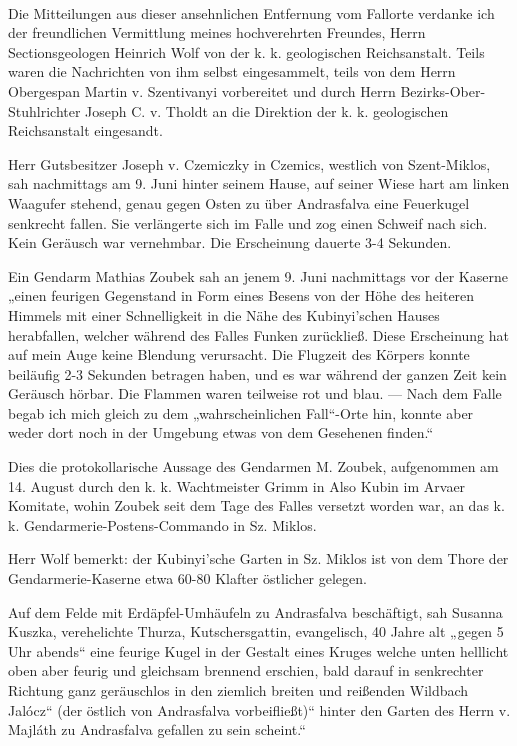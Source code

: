 \documentclass[a4paper, 11pt, oneside, german]{article}
\begin{document}
\paragraph{}
Die Mitteilungen aus dieser ansehnlichen Entfernung vom Fallorte verdanke ich der freundlichen Vermittlung meines hochverehrten Freundes, Herrn Sectionsgeologen Heinrich Wolf von der k. k. geologischen Reichsanstalt. Teils waren die Nachrichten von ihm selbst eingesammelt, teils von dem Herrn Obergespan Martin v. Szentivanyi vorbereitet und durch Herrn Bezirks-Ober-Stuhlrichter Joseph C. v. Tholdt an die Direktion der k. k. geologischen Reichsanstalt eingesandt.

Herr Gutsbesitzer Joseph v. Czemiczky in Czemics, westlich von Szent-Miklos, sah nachmittags am 9. Juni hinter seinem Hause, auf seiner Wiese hart am linken Waagufer stehend, genau gegen Osten zu über Andrasfalva eine Feuerkugel senkrecht fallen. Sie verlängerte sich im Falle und zog einen Schweif nach sich. Kein Geräusch war vernehmbar. Die Erscheinung dauerte 3-4 Sekunden.

Ein Gendarm Mathias Zoubek sah an jenem 9. Juni nachmittags vor der Kaserne „einen feurigen Gegenstand in Form eines Besens von der Höhe des heiteren Himmels mit einer Schnelligkeit in die Nähe des Kubinyi'schen Hauses herabfallen, welcher während des Falles Funken zurückließ. Diese Erscheinung hat auf mein Auge keine Blendung verursacht. Die Flugzeit des Körpers konnte beiläufig 2-3 Sekunden betragen haben, und es war während der ganzen Zeit kein Geräusch hörbar. Die Flammen waren teilweise rot und blau. --- Nach dem Falle begab ich mich gleich zu dem „wahrscheinlichen Fall“-Orte hin, konnte aber weder dort noch in der Umgebung etwas von dem Gesehenen finden.“

Dies die protokollarische Aussage des Gendarmen M. Zoubek, aufgenommen am 14. August durch den k. k. Wachtmeister Grimm in Also Kubin im Arvaer Komitate, wohin Zoubek seit dem Tage des Falles versetzt worden war, an das k. k. Gendarmerie-Postens-Commando in Sz. Miklos.

Herr Wolf bemerkt: der Kubinyi'sche Garten in Sz. Miklos ist von dem Thore der Gendarmerie-Kaserne etwa 60-80 Klafter östlicher gelegen.

Auf dem Felde mit Erdäpfel-Umhäufeln zu Andrasfalva beschäftigt, sah Susanna Kuszka, verehelichte Thurza, Kutschersgattin, evangelisch, 40 Jahre alt „gegen 5 Uhr abends“ eine feurige Kugel in der Gestalt eines Kruges welche unten helllicht oben aber feurig und gleichsam brennend erschien, bald darauf in senkrechter Richtung ganz geräuschlos in den ziemlich breiten und reißenden Wildbach Jalócz“ (der östlich von Andrasfalva vorbeifließt)“ hinter den Garten des Herrn v. Majláth zu Andrasfalva gefallen zu sein scheint.“
\end{document}
